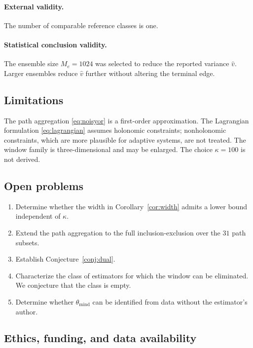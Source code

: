 \documentclass[11pt]{article}
\theoremstyle{remark}
\begin{document}
\paragraph{External validity.} The number of comparable reference classes is one.

\paragraph{Statistical conclusion validity.} The ensemble size $M_e=1024$ was selected to reduce the reported variance $\widehat{v}$. Larger ensembles reduce $\widehat{v}$ further without altering the terminal edge.

\subsection{Limitations}

The path aggregation \eqref{eq:noisyor} is a first-order approximation. The Lagrangian formulation \eqref{eq:lagrangian} assumes holonomic constraints; nonholonomic constraints, which are more plausible for adaptive systems, are not treated. The window family is three-dimensional and may be enlarged. The choice $\kappa=100$ is not derived.

\subsection{Open problems}

\begin{enumerate}[label=(P\arabic*),leftmargin=3em]
  \item Determine whether the width in Corollary~\ref{cor:width} admits a lower bound independent of $\kappa$.
  \item Extend the path aggregation to the full inclusion-exclusion over the $31$ path subsets.
  \item Establish Conjecture~\ref{conj:dual}.
  \item Characterize the class of estimators for which the window can be eliminated. We conjecture that the class is empty.
  \item Determine whether $\theta_{\mathrm{mind}}$ can be identified from data without the estimator's author.
\end{enumerate}

\subsection{Ethics, funding, and data availability}
\end{document}
